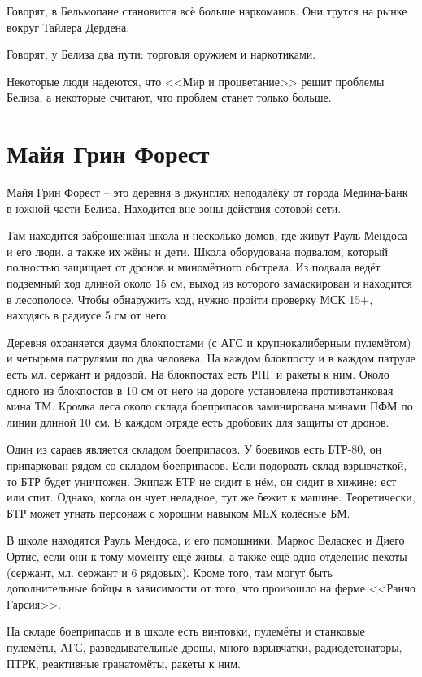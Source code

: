 \documentclass{article}
\begin{document}
Говорят, в Бельмопане становится всё больше наркоманов. Они трутся на
рынке вокруг Тайлера Дердена.

Говорят, у Белиза два пути: торговля оружием и наркотиками.

Некоторые люди надеются, что <<Мир и процветание>> решит проблемы Белиза,
а некоторые считают, что проблем станет только больше.

\section{Майя Грин
Форест}\label{maya-green-forest}

Майя Грин Форест -- это деревня в джунглях неподалёку от города
Медина-Банк в южной части Белиза. Находится вне зоны действия сотовой
сети.

Там находится заброшенная школа и несколько домов, где живут Рауль
Мендоса и его люди, а также их жёны и дети. Школа оборудована подвалом,
который полностью защищает от дронов и миномётного обстрела. Из подвала
ведёт подземный ход длиной около 15 см, выход из которого замаскирован и
находится в лесополосе. Чтобы обнаружить ход, нужно пройти проверку МСК
15+, находясь в радиусе 5 см от него.

Деревня охраняется двумя блокпостами (с АГС и крупнокалиберным
пулемётом) и четырьмя патрулями по два человека. На каждом блокпосту и в
каждом патруле есть мл. сержант и рядовой. На блокпостах есть РПГ и
ракеты к ним. Около одного из блокпостов в 10 см от него на дороге
установлена противотанковая мина ТМ. Кромка леса около склада
боеприпасов заминирована минами ПФМ по линии длиной 10 см. В каждом
отряде есть дробовик для защиты от дронов.

Один из сараев является складом боеприпасов. У боевиков есть БТР-80, он
припаркован рядом со складом боеприпасов. Если подорвать склад
взрывчаткой, то БТР будет уничтожен. Экипаж БТР не сидит в нём, он сидит
в хижине: ест или спит. Однако, когда он чует неладное, тут же бежит к
машине. Теоретически, БТР может угнать персонаж с хорошим навыком МЕХ
колёсные БМ.

В школе находятся Рауль Мендоса, и его помощники, Маркос Веласкес и
Диего Ортис, если они к тому моменту ещё живы, а также ещё одно
отделение пехоты (сержант, мл. сержант и 6 рядовых). Кроме того, там
могут быть дополнительные бойцы в зависимости от того, что произошло на
ферме <<Ранчо Гарсия>>.

На складе боеприпасов и в школе есть винтовки, пулемёты и станковые
пулемёты, АГС, разведывательные дроны, много взрывчатки,
радиодетонаторы, ПТРК, реактивные гранатомёты, ракеты к ним.
\end{document}

